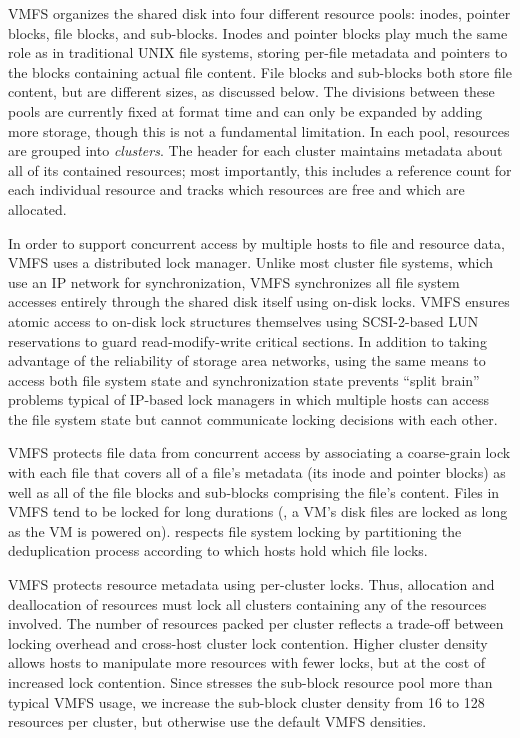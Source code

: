 VMFS organizes the shared disk into four different resource pools:
inodes, pointer blocks, file blocks, and sub-blocks.  Inodes and
pointer blocks play much the same role as in traditional UNIX file
systems, storing per-file metadata and pointers to the blocks
containing actual file content.  File blocks and sub-blocks both store
file content, but are different sizes, as discussed below.  The
divisions between these pools are currently fixed at format time and
can only be expanded by adding more storage, though this is not a
fundamental limitation.  In each pool,
resources are grouped into \emph{clusters}. The header for each cluster
maintains metadata about all of its contained resources; most
importantly, this includes a reference count for each
individual resource and tracks which resources are free and which are
allocated.

In order to support concurrent access by multiple hosts to file and
resource data, VMFS uses a distributed lock manager.
Unlike most cluster file systems, which use an
IP network for synchronization, VMFS synchronizes all file system
accesses entirely through the shared disk itself using on-disk locks.
VMFS ensures atomic access to on-disk lock structures themselves using
SCSI-2-based LUN reservations to guard read-modify-write critical
sections.  In addition to taking advantage of the reliability of
storage area networks, using the same means to access both file system
state
and synchronization state prevents ``split brain'' problems typical of
IP-based lock managers in which multiple hosts can access the file
system state but cannot communicate locking decisions with each other.

VMFS protects file data from concurrent access by associating a
coarse-grain lock with each file that covers all of a file's metadata
(its inode and pointer blocks) as well as all of the file blocks and
sub-blocks comprising the file's content.  Files in VMFS tend to be
locked for long durations (\eg, a VM's disk files are locked as long
as the VM is powered on). \DeDe respects file system locking by
partitioning the deduplication process according to which hosts hold
which file locks.

VMFS protects resource metadata using per-cluster locks.  Thus,
allocation and deallocation of resources must lock all clusters
containing any of the resources involved.  The number of resources
packed per cluster reflects a trade-off between locking overhead and
cross-host cluster lock contention.  Higher cluster density allows
hosts to manipulate more resources with fewer locks, but at the cost of
increased lock contention.  Since \DeDe stresses the sub-block resource pool
more than typical VMFS usage, we increase the sub-block cluster
density from 16 to 128 resources per cluster, but otherwise use the
default VMFS densities.

